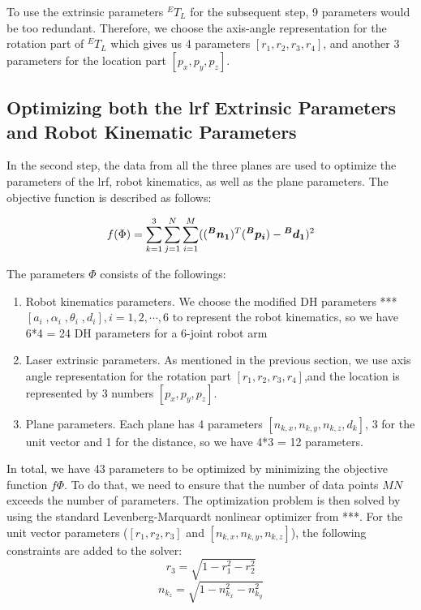To use the extrinsic parameters ${^E}T_L$ for the subsequent step, 9 parameters would be too redundant. Therefore, we choose the axis-angle representation for the rotation part of ${^E}T_L$ which gives us 4 parameters $[r_1, r_2, r_3, r_4]$, and another 3 parameters for the location part $[p_x, p_y, p_z]$. 


\subsection{Optimizing both the \ac{lrf} Extrinsic Parameters and Robot Kinematic Parameters}
\label{sec:second_step}
In the second step, the data from all the three planes are used to optimize the parameters of the \ac{lrf}, robot kinematics, as well as the plane parameters. The objective function is described as follows:

\begin{equation}
 f(\Phi) =  \sum_{k=1}^{3} \sum_{j=1}^{N} \sum_{i=1}^{M} ((\vb*{{^B}n_1}) ^T (\vb*{{^B}p_i}) - \vb*{{^B}d_1})^2
\end{equation}

The parameters $\Phi$ consists of the followings:
\begin{enumerate}
\item Robot kinematics parameters. We choose the modified DH parameters *** $[a_i \;, \alpha_i \;,\theta_i \;,d_i], i=1, 2, \cdots ,6$ to represent the robot kinematics, so we have 6*4 = 24 DH parameters for a 6-joint robot arm
\item Laser extrinsic parameters. As mentioned in the previous section, we use axis angle representation for the rotation part $[r_1, r_2, r_3, r_4]$,and the location is represented by 3 numbers $[p_x, p_y, p_z]$. 
\item Plane parameters. Each plane has 4 parameters $[n_{k,x}, n_{k,y}, n_{k,z}, d_{k}]$, 3 for the unit vector and 1 for the distance, so we have 4*3 = 12 parameters. 
\end{enumerate}

In total, we have 43 parameters to be optimized by minimizing the objective function $f{\Phi}$. To do that, we need to ensure that the number of data points $MN$ exceeds the number of parameters. The optimization problem is then solved by using the standard Levenberg-Marquardt nonlinear optimizer from ***. For the unit vector parameters ($[r_1, r_2, r_3]$ and  $[n_{k,x}, n_{k,y}, n_{k,z}]$), the following constraints are added to the solver:
\begin{equation}
r_3 = \sqrt{1 - r_1^2 - r_2^2}
\end{equation}
\begin{equation}
n_{k_z} = \sqrt{1 - n_{k_x}^2 - n_{k_y}^2}
\end{equation}

